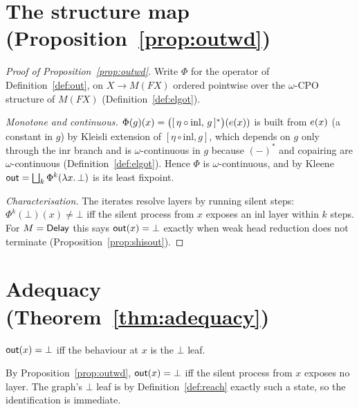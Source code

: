 \section{The structure map (Proposition~\ref{prop:outwd})}\label{app:out}
\begin{proof}[Proof of Proposition~\ref{prop:outwd}]
  Write $\Phi$ for the operator of Definition~\ref{def:out}, on $X \to M(F X)$ ordered pointwise over
  the $\omega$-CPO structure of $M(F X)$ (Definition~\ref{def:elgot}).

  \emph{Monotone and continuous.} $\Phi(g)(x) = \big([\,\eta\circ\mathrm{inl},\,g\,]^{*}\big)(e(x))$
  is built from $e(x)$ (a constant in $g$) by Kleisli extension of $[\eta\circ\mathrm{inl}, g]$,
  which depends on $g$ only through the $\mathrm{inr}$ branch and is $\omega$-continuous in $g$ because
  $(-)^{*}$ and copairing are $\omega$-continuous (Definition~\ref{def:elgot}). Hence $\Phi$ is
  $\omega$-continuous, and by Kleene $\mathsf{out} = \bigsqcup_k \Phi^k(\lambda x.\,\bot)$ is its least
  fixpoint.

  \emph{Characterisation.} The iterates resolve layers by running silent steps: $\Phi^k(\bot)(x) \neq
  \bot$ iff the silent process from $x$ exposes an $\mathrm{inl}$ layer within $k$ steps. 
  For $M = \mathsf{Delay}$ this says $\mathsf{out}(x) = \bot$ exactly when weak head reduction does not terminate
  (Proposition~\ref{prop:shisout}).
\end{proof}

\section{Adequacy (Theorem~\ref{thm:adequacy})}\label{app:adequacy}
\begin{lemma}\label{lem:rootactive}
  $\mathsf{out}(x) = \bot$ iff the behaviour at $x$ is the $\bot$ leaf.
\end{lemma}
\noindent
By Proposition~\ref{prop:outwd}, $\mathsf{out}(x) = \bot$ iff the silent process from $x$ exposes no layer.
The graph's $\bot$ leaf is by Definition~\ref{def:reach} exactly such a state, so the identification is
immediate.

